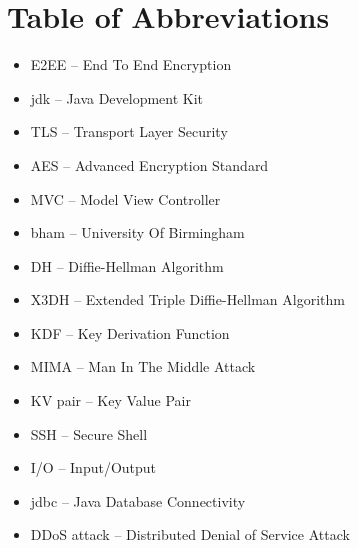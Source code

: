 \section*{Table of Abbreviations}
\begin{itemize}[nolistsep]
\item E2EE -- End To End Encryption
\item jdk -- Java Development Kit
\item TLS -- Transport Layer Security
\item AES -- Advanced Encryption Standard
\item MVC -- Model View Controller
\item bham -- University Of Birmingham
\item DH -- Diffie-Hellman Algorithm
\item X3DH -- Extended Triple Diffie-Hellman Algorithm
\item KDF -- Key Derivation Function
\item MIMA -- Man In The Middle Attack
\item KV pair -- Key Value Pair
\item SSH -- Secure Shell
\item I/O -- Input/Output
\item jdbc -- Java Database Connectivity
\item DDoS attack -- Distributed Denial of Service Attack
\end{itemize}